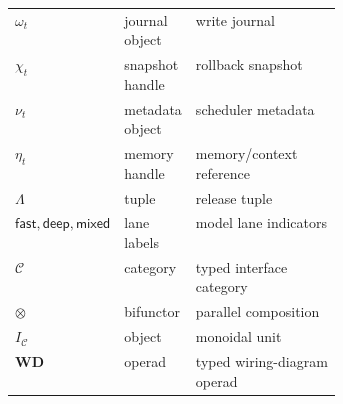 \documentclass[11pt]{article}
\theoremstyle{remark}
\newcommand{\fast}{\mathsf{fast}}
\newcommand{\deep}{\mathsf{deep}}
\newcommand{\mixed}{\mathsf{mixed}}
\begin{document}
\begin{center}
\begin{tabularx}{\linewidth}{@{}p{0.18\linewidth}p{0.20\linewidth}X@{}}
\(\omega_t\) & journal object & write journal \\
\(\chi_t\) & snapshot handle & rollback snapshot \\
\(\nu_t\) & metadata object & scheduler metadata \\
\(\eta_t\) & memory handle & memory/context reference \\
\(\Lambda\) & tuple & release tuple \\
\(\fast,\deep,\mixed\) & lane labels & model lane indicators \\
\(\mathcal{C}\) & category & typed interface category \\
\(\otimes\) & bifunctor & parallel composition \\
\(I_{\mathcal{C}}\) & object & monoidal unit \\
\(\mathbf{WD}\) & operad & typed wiring-diagram operad \\
\bottomrule
\end{tabularx}
\end{center}
\newpage

\printbibliography
\end{document}
